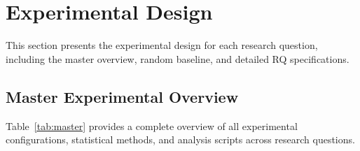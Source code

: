 \section{Experimental Design}
\label{sec:experimental_design}

This section presents the experimental design for each research question, including the master overview, random baseline, and detailed RQ specifications.

\subsection{Master Experimental Overview}

Table~\ref{tab:master} provides a complete overview of all experimental configurations, statistical methods, and analysis scripts across research questions.

